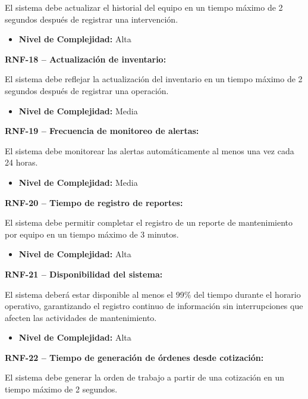 \documentclass[12pt,a4paper]{article}
\begin{document}
El sistema debe actualizar el historial del equipo en un tiempo máximo de 2 segundos después de registrar una intervención.

\begin{itemize}
  \item \textbf{Nivel de Complejidad:} Alta
\end{itemize}

\textbf{RNF-18 – Actualización de inventario:}

El sistema debe reflejar la actualización del inventario en un tiempo máximo de 2 segundos después de registrar una operación.

\begin{itemize}
  \item \textbf{Nivel de Complejidad:} Media
\end{itemize}

\textbf{RNF-19 – Frecuencia de monitoreo de alertas:}

El sistema debe monitorear las alertas automáticamente al menos una vez cada 24 horas.

\begin{itemize}
  \item \textbf{Nivel de Complejidad:} Media
\end{itemize}

\textbf{RNF-20 – Tiempo de registro de reportes:}

El sistema debe permitir completar el registro de un reporte de mantenimiento por equipo en un tiempo máximo de 3 minutos.

\begin{itemize}
  \item \textbf{Nivel de Complejidad:} Alta
\end{itemize}

\textbf{RNF-21 – Disponibilidad del sistema:}

El sistema deberá estar disponible al menos el 99\% del tiempo durante el horario operativo, garantizando el registro continuo de información sin interrupciones que afecten las actividades de mantenimiento.

\begin{itemize}
  \item \textbf{Nivel de Complejidad:} Alta
\end{itemize}

\textbf{RNF-22 – Tiempo de generación de órdenes desde cotización:}

El sistema debe generar la orden de trabajo a partir de una cotización en un tiempo máximo de 2 segundos.
\end{document}
